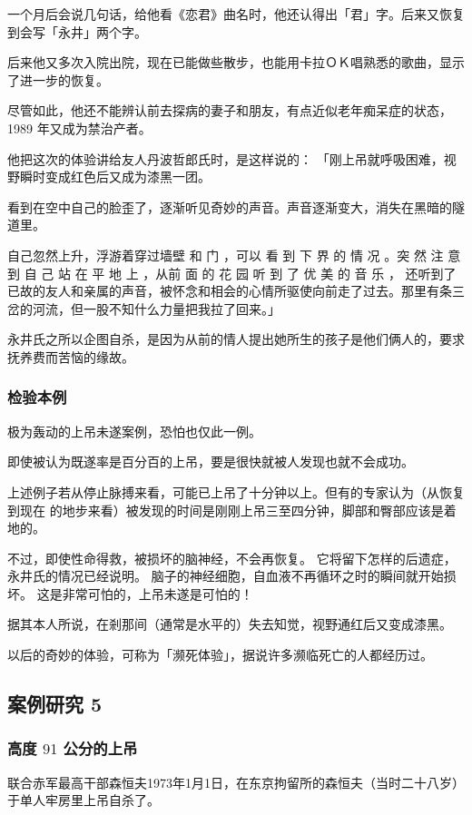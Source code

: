 \documentclass[UTF8]{ctexart}
\begin{document}
一个月后会说几句话，给他看《恋君》曲名时，他还认得出「君」字。后来又恢复到会写「永井」两个字。

后来他又多次入院出院，现在已能做些散步，也能用卡拉ＯＫ唱熟悉的歌曲，显示了进一步的恢复。

尽管如此，他还不能辨认前去探病的妻子和朋友，有点近似老年痴呆症的状态，1989 年又成为禁治产者。

他把这次的体验讲给友人丹波哲郎氏时，是这样说的： 「刚上吊就呼吸困难，视野瞬时变成红色后又成为漆黑一团。

看到在空中自己的脸歪了，逐渐听见奇妙的声音。声音逐渐变大，消失在黑暗的隧道里。

自己忽然上升，浮游着穿过墙壁 和 门 ，可以 看 到 下 界 的 情 况 。突 然 注 意 到 自 己 站 在 平 地 上 ，从前 面 的 花 园 听 到 了 优 美 的 音 乐 ， 还听到了已故的友人和亲属的声音，被怀念和相会的心情所驱使向前走了过去。那里有条三岔的河流，但一股不知什么力量把我拉了回来。」 

永井氏之所以企图自杀，是因为从前的情人提出她所生的孩子是他们俩人的，要求抚养费而苦恼的缘故。

\subsubsection*{检验本例}

极为轰动的上吊未遂案例，恐怕也仅此一例。

即使被认为既遂率是百分百的上吊，要是很快就被人发现也就不会成功。

上述例子若从停止脉搏来看，可能已上吊了十分钟以上。但有的专家认为（从恢复到现在
的地步来看）被发现的时间是刚刚上吊三至四分钟，脚部和臀部应该是着地的。

不过，即使性命得救，被损坏的脑神经，不会再恢复。
它将留下怎样的后遗症，永井氏的情况已经说明。
脑子的神经细胞，自血液不再循环之时的瞬间就开始损坏。
这是非常可怕的，上吊未遂是可怕的！

据其本人所说，在剎那间（通常是水平的）失去知觉，视野通红后又变成漆黑。

以后的奇妙的体验，可称为「濒死体验」，据说许多濒临死亡的人都经历过。

\subsection{案例研究 5}
\subsubsection*{高度 $91$ 公分的上吊}

联合赤军最高干部森恒夫1973年1月1日，在东京拘留所的森恒夫（当时二十八岁）于单人牢房里上吊自杀了。
\end{document}

